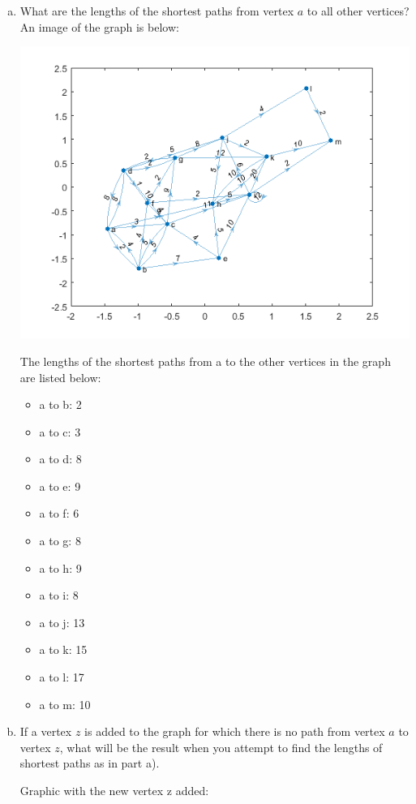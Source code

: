 \documentclass[../report/main.tex]{subfiles}
\begin{document}
\begin{enumerate}[a)]
	\item What are the lengths of the shortest paths from vertex $a$ to all other vertices?
    An image of the graph is below:

    \includegraphics{../problem_three/problem3_digraph.png}

    The lengths of the shortest paths from a to the other vertices in the graph are listed below:
    \begin{itemize}
        \item a to b: 2
        \item a to c: 3
        \item a to d: 8
        \item a to e: 9
        \item a to f: 6
        \item a to g: 8
        \item a to h: 9
        \item a to i: 8
        \item a to j: 13
        \item a to k: 15
        \item a to l: 17
        \item a to m: 10
    \end{itemize}
	\item If a vertex $z$ is added to the graph for which there is no path from vertex $a$ to vertex $z$, what will be the result when you attempt to find the lengths of shortest paths as in part a).

Graphic with the new vertex z added:


\end{enumerate}
\end{document}
